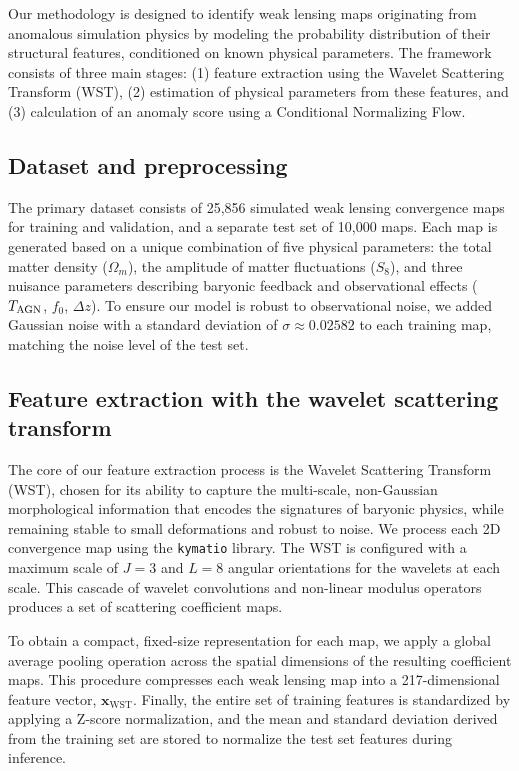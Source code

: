 \documentclass[]{article}
\begin{document}
Our methodology is designed to identify weak lensing maps originating from anomalous simulation physics by modeling the probability distribution of their structural features, conditioned on known physical parameters. The framework consists of three main stages: (1) feature extraction using the Wavelet Scattering Transform (WST), (2) estimation of physical parameters from these features, and (3) calculation of an anomaly score using a Conditional Normalizing Flow.

\subsection{Dataset and preprocessing}
The primary dataset consists of 25,856 simulated weak lensing convergence maps for training and validation, and a separate test set of 10,000 maps. Each map is generated based on a unique combination of five physical parameters: the total matter density ($\Omega_m$), the amplitude of matter fluctuations ($S_8$), and three nuisance parameters describing baryonic feedback and observational effects ($T_{\rm AGN}$, $f_0$, $\Delta z$). To ensure our model is robust to observational noise, we added Gaussian noise with a standard deviation of $\sigma \approx 0.02582$ to each training map, matching the noise level of the test set.

\subsection{Feature extraction with the wavelet scattering transform}
The core of our feature extraction process is the Wavelet Scattering Transform (WST), chosen for its ability to capture the multi-scale, non-Gaussian morphological information that encodes the signatures of baryonic physics, while remaining stable to small deformations and robust to noise. We process each 2D convergence map using the \texttt{kymatio} library. The WST is configured with a maximum scale of $J=3$ and $L=8$ angular orientations for the wavelets at each scale. This cascade of wavelet convolutions and non-linear modulus operators produces a set of scattering coefficient maps.

To obtain a compact, fixed-size representation for each map, we apply a global average pooling operation across the spatial dimensions of the resulting coefficient maps. This procedure compresses each weak lensing map into a 217-dimensional feature vector, $\mathbf{x}_{\text{WST}}$. Finally, the entire set of training features is standardized by applying a Z-score normalization, and the mean and standard deviation derived from the training set are stored to normalize the test set features during inference.
\end{document}
